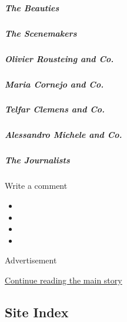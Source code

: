 \href{13tmag-beauties.html}{}

\hypertarget{the-beauties}{%
\subparagraph{The Beauties}\label{the-beauties}}

\href{/interactive/2020/04/13/t-magazine/nyc-downtown-nightlife-party-scene.html}{}

\hypertarget{the-scenemakers}{%
\subparagraph{The Scenemakers}\label{the-scenemakers}}

\href{/interactive/2020/04/13/t-magazine/maria-cornejo-olivier-rousteing-telfar-clemens-alessandro-michele.html\#olivier-rousteing-and-co}{}

\hypertarget{olivier-rousteing-and-co}{%
\subparagraph{Olivier Rousteing and
Co.}\label{olivier-rousteing-and-co}}

\href{/interactive/2020/04/13/t-magazine/maria-cornejo-olivier-rousteing-telfar-clemens-alessandro-michele.html\#maria-cornejo-and-co}{}

\hypertarget{maria-cornejo-and-co}{%
\subparagraph{Maria Cornejo and Co.}\label{maria-cornejo-and-co}}

\href{/interactive/2020/04/13/t-magazine/maria-cornejo-olivier-rousteing-telfar-clemens-alessandro-michele.html\#telfar-clemens-and-co}{}

\hypertarget{telfar-clemens-and-co}{%
\subparagraph{Telfar Clemens and Co.}\label{telfar-clemens-and-co}}

\href{/interactive/2020/04/13/t-magazine/maria-cornejo-olivier-rousteing-telfar-clemens-alessandro-michele.html\#alessandro-michele-and-co}{}

\hypertarget{alessandro-michele-and-co}{%
\subparagraph{Alessandro Michele and
Co.}\label{alessandro-michele-and-co}}

\href{/interactive/2020/04/13/t-magazine/foreign-correspondents.html}{}

\hypertarget{the-journalists}{%
\subparagraph{The Journalists}\label{the-journalists}}

Write a comment

\begin{itemize}
\item
\item
\item
\item
\end{itemize}

Advertisement

\protect\hyperlink{after-bottom}{Continue reading the main story}

\hypertarget{site-index}{%
\subsection{Site Index}\label{site-index}}

